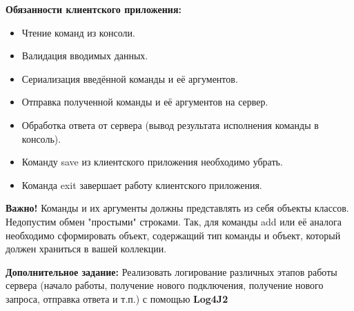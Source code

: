 \textbf{Обязанности клиентского приложения:}
\begin{itemize}
\item Чтение команд из консоли.
\item Валидация вводимых данных.
\item Сериализация введённой команды и её аргументов.
\item Отправка полученной команды и её аргументов на сервер.
\item Обработка ответа от сервера (вывод результата исполнения команды в консоль).
\item Команду save из клиентского приложения необходимо убрать.
\item Команда exit завершает работу клиентского приложения.
\end{itemize}

\textbf{Важно!}
Команды и их аргументы должны представлять из себя объекты классов.
Недопустим обмен "простыми" строками.
Так, для команды add или её аналога необходимо сформировать объект,
содержащий тип команды и объект, который должен храниться в вашей коллекции.

\textbf{Дополнительное задание:}
Реализовать логирование различных этапов работы сервера
(начало работы, получение нового подключения, получение нового запроса, отправка ответа и т.п.) с помощью \textbf{Log4J2}
